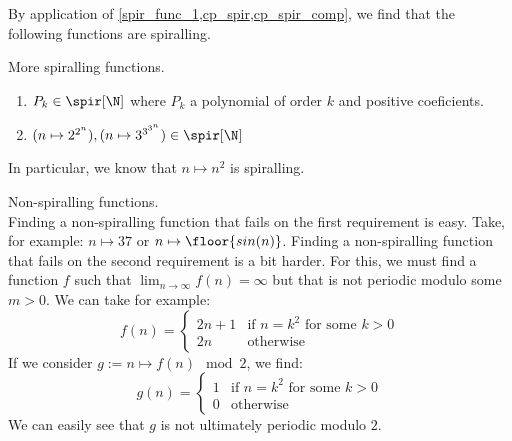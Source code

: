 By application of \cref{spir_func_1,cp_spir,cp_spir_comp}, we find that the following functions are spiralling.

\begin{corollary}{More spiralling functions.}\label{more_spir}
	\begin{enumerate}
		\item $P_k\in\spir[\N]$ where $P_k$ a polynomial of order $k$ and positive coeficients.
		\item $(n \mapsto 2^{2^n}),(n \mapsto 3^{3^{3^n}})\in\spir[\N]$
	\end{enumerate}
	In particular, we know that $n \mapsto n^2$ is spiralling.
\end{corollary}

\begin{example}{Non-spiralling functions.}\hfill\\
Finding a non-spiralling function that fails on the first requirement is easy. Take, for example: $n \mapsto 37$ or $n \mapsto \floor{sin(n)}$.
Finding a non-spiralling function that fails on the second requirement is a bit harder. For this, we must find a function $f$ such that $\lim_{n\to\infty}f(n)=\infty$ but that is not periodic modulo some $m>0$. We can take for example: 
$$f(n) = 
\begin{cases} 
	2n + 1 &\mbox{if } n = k^2 \text{ for some } k>0\\
	2n &\mbox{otherwise }
\end{cases}
$$
If we consider $g := n \mapsto f(n)\mod 2$, we find: 
$$g(n) = 
\begin{cases} 
	1 &\mbox{if } n = k^2 \text{ for some } k>0\\
	0 &\mbox{otherwise }
\end{cases}
$$
We can easily see that $g$ is not ultimately periodic modulo $2$.
\end{example}

